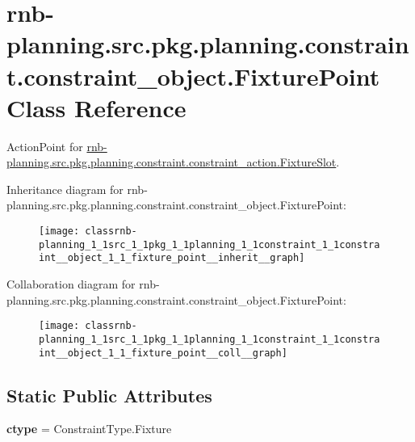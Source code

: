 \hypertarget{classrnb-planning_1_1src_1_1pkg_1_1planning_1_1constraint_1_1constraint__object_1_1_fixture_point}{}\section{rnb-\/planning.src.\+pkg.\+planning.\+constraint.\+constraint\+\_\+object.\+Fixture\+Point Class Reference}
\label{classrnb-planning_1_1src_1_1pkg_1_1planning_1_1constraint_1_1constraint__object_1_1_fixture_point}


Action\+Point for \hyperlink{classrnb-planning_1_1src_1_1pkg_1_1planning_1_1constraint_1_1constraint__action_1_1_fixture_slot}{rnb-\/planning.\+src.\+pkg.\+planning.\+constraint.\+constraint\+\_\+action.\+Fixture\+Slot}.  




Inheritance diagram for rnb-\/planning.src.\+pkg.\+planning.\+constraint.\+constraint\+\_\+object.\+Fixture\+Point\+:
\nopagebreak
\begin{figure}[H]
\begin{center}
\leavevmode
\texttt{[image: classrnb-planning\_1\_1src\_1\_1pkg\_1\_1planning\_1\_1constraint\_1\_1constraint\_\_object\_1\_1\_fixture\_point\_\_inherit\_\_graph]}
\end{center}
\end{figure}


Collaboration diagram for rnb-\/planning.src.\+pkg.\+planning.\+constraint.\+constraint\+\_\+object.\+Fixture\+Point\+:
\nopagebreak
\begin{figure}[H]
\begin{center}
\leavevmode
\texttt{[image: classrnb-planning\_1\_1src\_1\_1pkg\_1\_1planning\_1\_1constraint\_1\_1constraint\_\_object\_1\_1\_fixture\_point\_\_coll\_\_graph]}
\end{center}
\end{figure}
\subsection*{Static Public Attributes}
\begin{DoxyCompactItemize}
\item 
\mbox{\label{classrnb-planning_1_1src_1_1pkg_1_1planning_1_1constraint_1_1constraint__object_1_1_fixture_point_a7e6807cb582730175391b7ceaa1ac71e}} 
{\bfseries ctype} = Constraint\+Type.\+Fixture
\end{DoxyCompactItemize}
